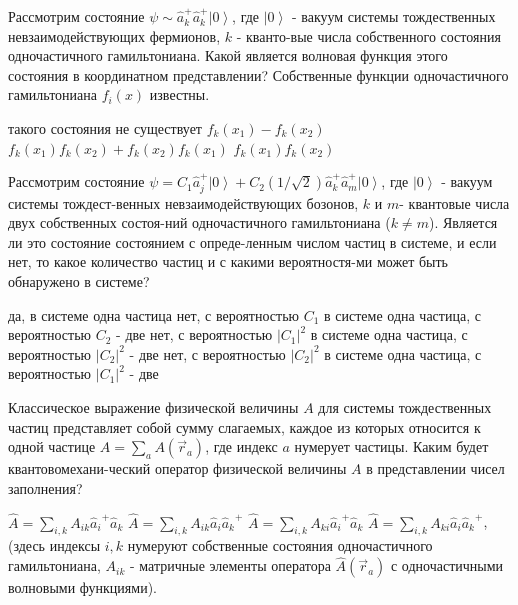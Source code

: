 \documentclass[11pt,a4paper]{exam}
\begin{document}
\begin{questions}
\question Рассмотрим состояние $\psi  \sim \hat a_k^ + \hat a_k^ + \left| 0 \right\rangle $, где $\left| 0 \right\rangle $ - вакуум системы тождественных невзаимодействующих фермионов, $k$ - кванто-вые числа собственного состояния одночастичного гамильтониана. Какой является волновая функция этого состояния в координатном представлении? Собственные функции одночастичного гамильтониана ${f_i}(x)$ известны.
\begin{choices}
\choice такого состояния не существует      
\choice ${f_k}({x_1}) - {f_k}({x_2})$
\choice ${f_k}({x_1}){f_k}({x_2}) + {f_k}({x_2}){f_k}({x_1})$     
\choice ${f_k}({x_1}){f_k}({x_2})$
\end{choices}

\question Рассмотрим состояние $\psi  = {C_1}\hat a_j^ + \left| 0 \right\rangle  + {C_2}(1/\sqrt 2 )\hat a_k^ + \hat a_m^ + \left| 0 \right\rangle $, где $\left| 0 \right\rangle $ - вакуум системы тождест-венных невзаимодействующих бозонов, $k$ и $m$- квантовые числа двух собственных состоя-ний одночастичного гамильтониана ($k \ne m$). Является ли это состояние состоянием с опреде-ленным числом частиц в системе, и если нет, то какое количество частиц и с какими вероятностя-ми может быть обнаружено в системе?
\begin{choices}
\choice да, в системе одна частица
\choice нет, с вероятностью ${C_1}$ в системе одна частица, с вероятностью ${C_2}$ - две
\choice нет, с вероятностью $|{C_1}{|^2}$ в системе одна частица, с вероятностью $|{C_2}{|^2}$ - две
\choice нет, с вероятностью $|{C_2}{|^2}$ в системе одна частица, с вероятностью $|{C_1}{|^2}$ - две
\end{choices}

\question Классическое выражение физической величины $A$ для системы тождественных частиц представляет собой сумму слагаемых, каждое из которых относится к одной частице $A = \sum\limits_a {A({{\vec r}_a})} $, где индекс $a$ нумерует частицы. Каким будет квантовомехани-ческий оператор физической величины $A$ в представлении чисел заполнения?
\begin{choices}
\choice $\hat A = \sum\limits_{i,k} {{A_{ik}}{{\hat a}_i}^ + {{\hat a}_k}} $ 
\choice $\hat A = \sum\limits_{i,k} {{A_{ik}}{{\hat a}_i}{{\hat a}_k}^ + } $ 
\choice $\hat A = \sum\limits_{i,k} {{A_{ki}}{{\hat a}_i}^ + {{\hat a}_k}} $ 
\choice $\hat A = \sum\limits_{i,k} {{A_{ki}}{{\hat a}_i}{{\hat a}_k}^ + } $,
(здесь индексы $i,k$ нумеруют собственные состояния одночастичного гамильтониана, ${A_{ik}}$ - матричные элементы оператора $\hat A({\vec r_a})$ с одночастичными волновыми функциями).
\end{choices}


\end{questions}
\end{document}
